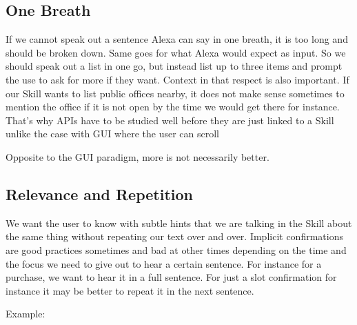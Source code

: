 \subsection*{One Breath}
If we cannot speak out a sentence Alexa can say in one breath, it is too long and should be broken down. Same goes for what Alexa would expect as input. %
So we should speak out a list in one go, but instead list up to three items and prompt the use to ask for more if they want. Context in that respect is also important. If our Skill wants to list public offices nearby, it does not make sense sometimes to mention the office if it is not open by the time we would get there for instance. That's why APIs have to be studied well before they are just linked to a Skill unlike the case with GUI where the user can scroll

Opposite to the GUI paradigm, more is not necessarily better.

\subsection*{Relevance and Repetition}

We want the user to know with subtle hints that we are talking in the Skill about the same thing without repeating our text over and over. Implicit confirmations are good practices sometimes and bad at other times depending on the time and the focus we need to give out to hear a certain sentence. For instance for a purchase, we want to hear it in a full sentence. For just a slot confirmation for instance it may be better to repeat it in the next sentence.

\noindent Example:




\begin{flushright}
\end{flushright}

